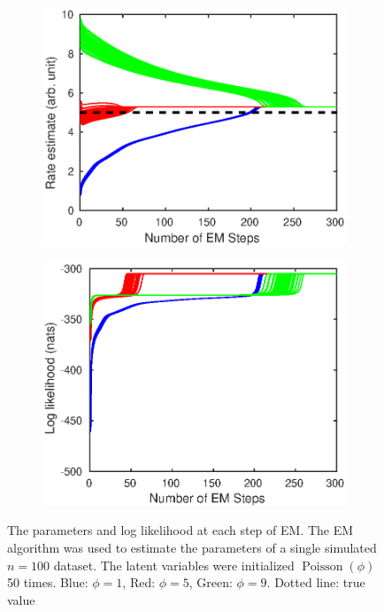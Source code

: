 \documentclass[12pt]{report}
\DeclareMathOperator{\poisson}{Poisson}
\begin{document}
\begin{figure}
\begin{subfigure}{0.45\textwidth}
	\end{subfigure}
	\begin{subfigure}{0.45\textwidth}
		\includegraphics[width=\textwidth]{figures/hierarchicalModel/EM_initial_rate.eps}
	\end{subfigure}
	\begin{subfigure}{0.45\textwidth}
		\includegraphics[width=\textwidth]{figures/hierarchicalModel/EM_initial_lnL.eps}
	\end{subfigure}
	\caption{The parameters and log likelihood at each step of EM. The EM algorithm was used to estimate the parameters of a single simulated $n=100$ dataset. The latent variables were initialized $\poisson(\phi)$ 50 times. Blue: $\phi=1$, Red: $\phi=5$, Green: $\phi=9$. Dotted line: true value}
	\label{fig:compoundPoisson_differentInitial}
\end{figure}
\end{document}
